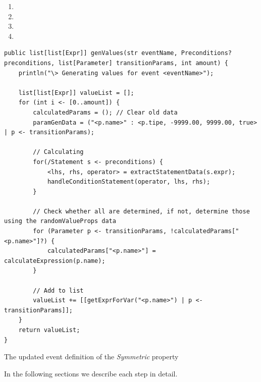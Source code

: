 \begin{enumerate}
  \item {}
  \item {}
  \item {}
  \item {}
\end{enumerate}
\begin{sourcecode}[!ht]
\begin{lstlisting}[language=Rascal]
public list[list[Expr]] genValues(str eventName, Preconditions? preconditions, list[Parameter] transitionParams, int amount) {
    println("\> Generating values for event <eventName>");

    list[list[Expr]] valueList = [];
    for (int i <- [0..amount]) {
        calculatedParams = (); // Clear old data
        paramGenData = ("<p.name>" : <p.tipe, -9999.00, 9999.00, true> | p <- transitionParams);

        // Calculating
        for(/Statement s <- preconditions) {
            <lhs, rhs, operator> = extractStatementData(s.expr);
            handleConditionStatement(operator, lhs, rhs);
        }

        // Check whether all are determined, if not, determine those using the randomValueProps data
        for (Parameter p <- transitionParams, !calculatedParams["<p.name>"]?) {
            calculatedParams["<p.name>"] = calculateExpression(p.name);
        }

        // Add to list
        valueList += [[getExprForVar("<p.name>") | p <- transitionParams]];
    }
    return valueList;
}
\end{lstlisting}
\caption{The updated event definition of the \textit{Symmetric} property}
\label{lst:experiment3_value_generation_code}
\end{sourcecode}
\FloatBarrier\noindent
%
In the following sections we describe each step in detail.

